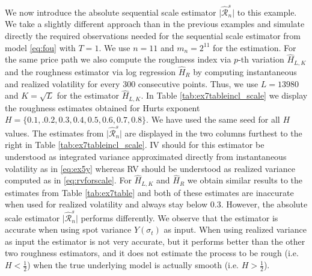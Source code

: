 \documentclass{article}
\begin{document}
We now introduce the absolute sequential scale estimator $\lvert \widehat{\mathscr{R}}_n^s\rvert$ to this example. We take a slightly different approach than in the previous examples and simulate directly the required observations needed for the sequential scale estimator from model \eqref{eq:fou} with $T=1$. We use $n=11$ and $m_n = 2^{11}$ for the estimation. For the same price path we also compute the roughness index via $p$-th variation $\hat{H}_{L,K}$ and the roughness estimator via log regression $\widehat{H}_R$ by computing instantaneous and realized volatility for every 300 consecutive points. Thus, we use $L=13980$ and $K=\sqrt{L}$ for the estimator $\hat{H}_{L,K}$. In Table \ref{tab:ex7tableincl_scale} we display the roughness estimates obtained for Hurts exponent $H=\{0.1,.0.2,0.3,0.4,0.5,0.6,0.7,0.8\}$. We have used the same seed for all $H$ values. The estimates from $\lvert \widehat{\mathscr{R}}_n^s\rvert$ are displayed in the two columns furthest to the right in Table \ref{tab:ex7tableincl_scale}. IV should for this estimator be understood as integrated variance approximated directly from instantaneous volatility as in \eqref{eq:ex5y} whereas RV should be understood as realized variance computed as in \eqref{eq:rvforscale}. For $\widehat{H}_{L,K}$ and $\widehat{H}_{R}$ we obtain similar results to the estimates from Table \ref{tab:ex7table} and both of these estimates are inaccurate when used for realized volatility and always stay below 0.3. However, the absolute scale estimator $\lvert \widehat{\mathscr{R}}_n^s\rvert$ performs differently. We observe that the estimator is accurate when using spot variance $Y(\sigma_t)$ as input. When using realized variance as input the estimator is not very accurate, but it performs better than the other two roughness estimators, and it does not estimate the process to be rough (i.e. $H<\frac{1}{2}$) when the true underlying model is actually smooth (i.e. $H>\frac{1}{2}$).
\end{document}
